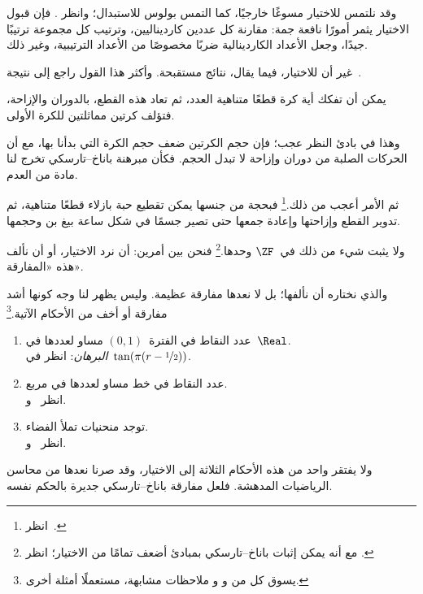 \documentclass[../../../include/open-logic-section]{subfiles}
\begin{document}

وقد نلتمس للاختيار مسوغًا خارجيًا، كما التمس بولوس للاستبدال؛ وانظر
. فإن قبول الاختيار يثمر أمورًا
نافعة جمة: مقارنة كل عددين كارديناليين، وترتيب كل مجموعة ترتيبًا جيدًا،
وجعل الأعداد الكاردينالية ضربًا مخصوصًا من الأعداد الترتيبية، وغير ذلك.

غير أن للاختيار، فيما يقال، نتائج مستقبحة. وأكثر هذا القول راجع إلى
نتيجة~\cite{BanachTarski1924}.

\begin{thm}
يمكن أن تفكك أية كرة قطعًا متناهية العدد، ثم تعاد هذه القطع، بالدوران
والإزاحة، فتؤلف كرتين مماثلتين للكرة الأولى.
\end{thm}
\noindent
وهذا في بادئ النظر عجب؛ فإن حجم الكرتين ضعف حجم الكرة التي بدأنا بها،
مع أن الحركات الصلبة من دوران وإزاحة لا تبدل الحجم. فكأن مبرهنة
باناخ--تارسكي تخرج لنا مادة من العدم.

ثم الأمر أعجب من ذلك.\footnote{انظر~\citet[Theorem 3.12]{Wagon2016}.}
فبحجة من جنسها يمكن تقطيع حبة بازلاء قطعًا متناهية، ثم تدوير القطع
وإزاحتها وإعادة جمعها حتى تصير جسمًا في شكل ساعة بيغ بن وحجمها.

ولا يثبت شيء من ذلك في~$\ZF$ وحدها.\footnote{مع أنه يمكن إثبات
باناخ--تارسكي بمبادئ أضعف تمامًا من الاختيار؛ انظر
\citet[303]{Wagon2016}.} فنحن بين أمرين: أن نرد الاختيار، أو أن نألف
هذه «المفارقة».

والذي نختاره أن نألفها؛ بل لا نعدها مفارقة عظيمة. وليس يظهر لنا وجه
كونها أشد مفارقة أو أخف من الأحكام الآتية.\footnote{يسوق كل من
\citet[276--7]{Potter2004} و\citet[16]{Weston2003} و
\citet[31, 308--9]{Wagon2016} ملاحظات مشابهة، مستعملًا أمثلة أخرى.}
\begin{enumerate}
	\item عدد النقاط في الفترة~$(0,1)$ مساو لعددها في~$\Real$.
	\\\emph{البرهان}: انظر في~$\tan(\pi(r-\nicefrac{1}{2}))$.
	\item عدد النقاط في خط مساو لعددها في مربع.
	\\انظر~ و.
	\item توجد منحنيات تملأ الفضاء.
	\\انظر~ و.
\end{enumerate}
ولا يفتقر واحد من هذه الأحكام الثلاثة إلى الاختيار، وقد صرنا نعدها من
محاسن الرياضيات المدهشة. فلعل مفارقة باناخ--تارسكي جديرة بالحكم نفسه.
\end{document}
